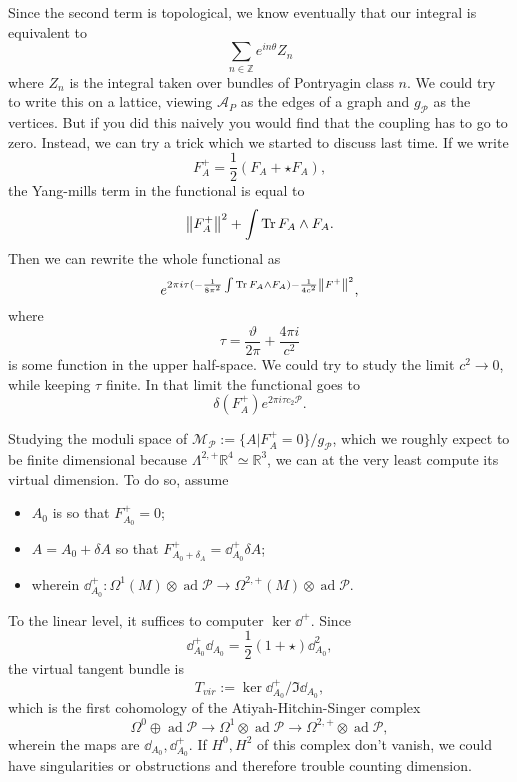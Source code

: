 \documentclass[leqno, openany]{memoir}
\theoremstyle{definition}
\theoremstyle{remark}
\theoremstyle{plain}
\theoremstyle{definition}
\theoremstyle{remark}
\DeclareMathOperator{\ad}{ad}
\begin{document}
Since the second term is topological, we know eventually that our integral is equivalent to
\[
\sum_{n \in \mathbb{Z}} e^{i n \theta} Z_{n}
\]
where $Z_{n}$ is the integral taken over bundles of Pontryagin class $n$.
  We could try to write this on a lattice, viewing $\mathcal{A}_{P}$ as the edges of a graph and $g_{\mathcal{P}}$ as the vertices. But if you did this naively you would find that the coupling has to go to zero.
  Instead, we can try a trick which we started to discuss last time. If we write
\[
F_{A}^{+} = \frac{1}{2} (F_{A} + \star F_{A}),
\]
the Yang-mills term in the functional is equal to
\[
\norm{F_{A}^{+}}^{2} + \int \Tr F_{A} \wedge F_{A}.
\]
Then we can rewrite the whole functional as
\[
e^{2\pi i \tau( -\frac{1}{8\pi^{2}} \int \Tr F_{A} \wedge F_{A} ) - \frac{1}{4c^{2}} \norm{F^{+}}^{2}},
\]
where
\[
\tau = \frac{\vartheta}{2\pi} + \frac{4\pi i }{c^{2}}
\]
is some function in the upper half-space.
We could try to study the limit $c^{2} \to 0$, while keeping $\tau$ finite.  In that limit the functional goes to
\[
\delta(F_{A}^{+}) e^{2\pi i \tau c_{2}\mathcal{P}}.
\]

Studying the moduli space of $\mathcal{M}_{\mathcal{P}} := \{ A | F_{A}^{+} = 0\}/g_{\mathcal{P}}$,  which we roughly expect to be finite dimensional because $\Lambda^{2,+} \mathbb{R}^{4} \simeq \mathbb{R}^{3}$, we can at the very least compute its virtual dimension.
To do so, assume
\begin{itemize}
  \item $A_{0}$ is so that $F_{A_{0}}^{+} = 0$;
  \item $A = A_{0} + \delta A$ so that $F_{A_{0} + \delta_{A}}^{+} = \dd_{A_{0}}^{+} \delta A$;
        \item wherein $\dd^{+}_{A_{0}} : \Omega^{1}(M) \otimes \ad\mathcal{P} \to \Omega^{2,+} (M) \otimes \ad \mathcal{P}$.
\end{itemize}

To the linear level, it suffices to computer $\ker \dd^{+}$. Since
\[
\dd^{+}_{A_{0}} \dd_{A_{0}} = \frac{1}{2} (1 + \star) \dd^{2}_{A_{0}},
\]
the virtual tangent bundle is
\[
T_{vir} := \ker \dd_{A_{0}}^{+}/\Im \dd_{A_{0}},
\]
which is the first cohomology of the Atiyah-Hitchin-Singer complex
\[
\Omega^{0} \oplus \ad \mathcal{P} \to \Omega^{1} \otimes \ad \mathcal{P} \to \Omega^{2,+} \otimes \ad\mathcal{P},
\]
wherein the maps are $\dd_{A_{0}}, \dd_{A_{0}}^{+}$.
If $H^{0},H^{2}$ of this complex don't vanish, we could have singularities or obstructions and therefore trouble counting dimension.
\end{document}
